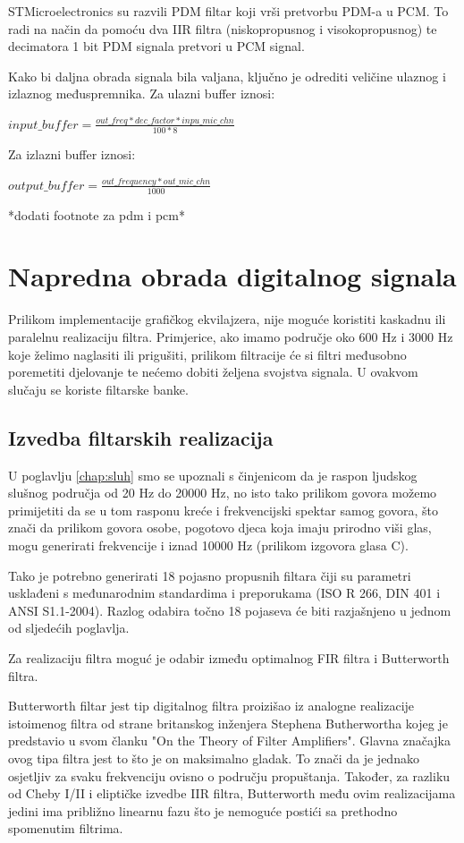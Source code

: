 \documentclass[times, utf8, diplomski]{fer}
\begin{document}
STMicroelectronics su razvili PDM filtar koji vrši pretvorbu PDM-a u PCM. To radi na način da pomoću dva IIR filtra (niskopropusnog i visokopropusnog) te decimatora 1 bit PDM signala pretvori u PCM signal. 

Kako bi daljna obrada signala bila valjana, ključno je odrediti veličine ulaznog i izlaznog međuspremnika. Za ulazni buffer iznosi:

$input\_buffer = \frac{out\_freq* dec\_factor * inpu\_mic\_chn}{100*8}$

Za izlazni buffer iznosi:

$output\_buffer = \frac{out\_frequency* out\_mic\_chn}{1000} $

*dodati footnote za pdm i pcm*

\chapter{Napredna obrada digitalnog signala}
Prilikom implementacije grafičkog ekvilajzera, nije moguće koristiti kaskadnu ili paralelnu realizaciju filtra. Primjerice, ako imamo područje oko 600 Hz i 3000 Hz koje želimo naglasiti ili prigušiti, prilikom filtracije će si filtri međusobno poremetiti djelovanje te nećemo dobiti željena svojstva signala. U ovakvom slučaju se koriste filtarske banke.

\section{Izvedba filtarskih realizacija}\label{filtri}
U poglavlju \ref{chap:sluh} smo se upoznali s činjenicom da je raspon ljudskog slušnog područja od 20 Hz do 20000 Hz, no isto tako prilikom govora možemo primijetiti da se u tom rasponu kreće i frekvencijski spektar samog govora, što znači da prilikom govora osobe, pogotovo djeca koja imaju prirodno viši glas, mogu generirati frekvencije i iznad 10000 Hz (prilikom izgovora glasa C). 

Tako je potrebno generirati 18 pojasno propusnih filtara  čiji su parametri usklađeni s međunarodnim standardima i preporukama (ISO R 266, DIN 401 i ANSI S1.1-2004). Razlog odabira točno 18 pojaseva će biti razjašnjeno u jednom od sljedećih poglavlja.
 
Za realizaciju filtra moguć je odabir između optimalnog FIR filtra i Butterworth filtra. 

Butterworth filtar jest tip digitalnog filtra proizišao iz analogne realizacije istoimenog filtra od strane britanskog inženjera Stephena Butherwortha kojeg je predstavio u svom članku "On the Theory of Filter Amplifiers". Glavna značajka ovog tipa filtra jest to što je on maksimalno gladak. To znači da je jednako osjetljiv za svaku frekvenciju ovisno o području propuštanja. Također, za razliku od Cheby I/II i eliptičke izvedbe IIR filtra, Butterworth među ovim realizacijama jedini ima približno linearnu fazu što je nemoguće postići sa prethodno spomenutim filtrima.
\end{document}
